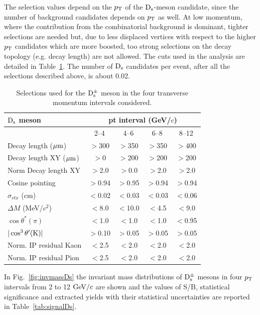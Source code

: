 The selection values depend on the $p_{\rm T}$ of the ${\rm D_s}$-meson candidate, since
the number of background candidates depends on $p_{\rm T}$ as well.
At low momentum, where the contribution from the combinatorial
background is dominant, tighter selections are needed but, due to less displaced 
vertices with respect to the higher $p_{\rm T}$ candidates which are more boosted, too strong selections
on the decay topology (e.g. decay length) are not allowed.
The cuts used in the analysis are detailed in Table~\ref{tab:cutsDs}.
The number of ${\rm D_s}$ candidates per event, after all the selections described above, is about 0.02.
\begin{table}[tbh!]
\centering
\begin{tabular}{|l|c|c|c|c|} 
\hline 
 ${\rm D_s}$ meson& \multicolumn{4}{c|}{pt interval (GeV/$c$)}\\
\hline
 & 2--4  & 4--6 & 6--8 & 8--12\\
\hline
Decay length ($\mathrm{\mu m}$)        & $>$300 & $>$350 & $>$350 & $>$400\\
Decay length XY ($\mathrm{\mu m}$)     & $>$0 & $>$200 & $>$200 & $>$200\\
Norm Decay length XY          & $>$2.0& $>$0.0 & $>$2.0 & $>$2.0\\
Cosine pointing              & $>$0.94 & $>$0.95 & $>$0.94 & $>$0.94\\
$\sigma_{vtx}$  (cm)          & $<$0.02 & $<$0.03 & $<$0.03 & $<$0.06\\
$\Delta M$ (MeV/$c^{2}$) & $<$8.0 & $<$10.0 & $<$4.5 & $<$9.0\\
$\cos \theta^*(\pi)$    & $<$1.0 & $<$1.0 & $<$1.0 & $<$0.95\\
$|\cos^3 \theta^\prime({\rm K})|$        & $>$0.10 & $>$0.05 & $>$0.05 & $>$0.05\\
Norm. IP residual Kaon  & $<$2.5 & $<$2.0 & $<$2.0 & $<$2.0 \\
Norm. IP residual Pion  & $<$2.5 & $<$2.0 & $<$2.0 & $<$2.0 \\[1ex]
\hline
\end{tabular}
\caption{Selections used for the ${\rm D_s^{\pm}}$ meson in the four transverse momentum intervals considered.} 
\label{tab:cutsDs}
\end{table}
In Fig.~\ref{fig:invmassDs} the invariant mass distributions 
of ${\rm D_s^{\pm}}$ mesons in four $p_{\rm T}$ intervals from 2 to 12 $\mathrm{GeV}/c$ are shown 
and the values of S/B, statistical significance and extracted yields 
with their statistical uncertainties are reported in Table~\ref{tab:signalDs}.
